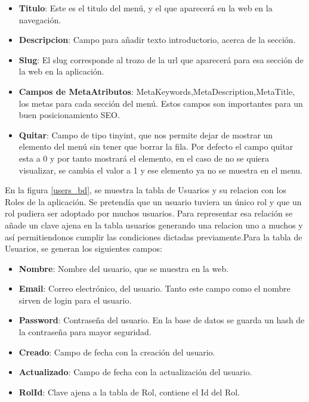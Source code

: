 \begin{itemize}

\item \textbf{Titulo}: Este es el titulo del menú, y el que aparecerá en la web en la navegación.
\item \textbf{Descripcion}: Campo para añadir texto introductorio, acerca de la sección.
\item \textbf{Slug}: El slug corresponde al trozo de la url que aparecerá para esa sección de la web en la aplicación.
\item \textbf{Campos de MetaAtributos}: MetaKeywords,MetaDescription,MetaTitle, los metas para cada sección del menú. Estos campos son importantes para un buen posicionamiento SEO.
\item \textbf{Quitar}: Campo de tipo tinyint, que nos permite dejar de mostrar un elemento del menú sin tener que borrar la fila. Por defecto el campo quitar esta a 0 y por tanto mostrará el elemento, en el caso de no se quiera visualizar, se cambia el valor a 1 y ese elemento ya no se muestra en el menu.

\end{itemize}

\vspace{5 mm}

En la figura \ref{users_bd}, se muestra la tabla de Usuarios y su relacion con los Roles de la aplicación. Se pretendía que un usuario tuviera un único rol y que un rol pudiera ser adoptado por muchos usuarios. Para representar esa relación se añade un clave ajena en la tabla usuarios generando una relacion uno a muchos y así permitiendonos cumplir las condiciones dictadas previamente.Para la tabla de Usuarios, se generan los siguientes campos:

\begin{itemize}

\item \textbf{Nombre}: Nombre del usuario, que se muestra en la web.
\item \textbf{Email}: Correo electrónico, del usuario. Tanto este campo como el nombre sirven de login para el usuario.
\item \textbf{Password}: Contraseña del usuario. En la base de datos se guarda un hash de la contraseña para mayor seguridad.
\item \textbf{Creado}: Campo de fecha con la creación del usuario.
\item \textbf{Actualizado}: Campo de fecha con la actualización del usuario.
\item \textbf{RolId}: Clave ajena a la tabla de Rol, contiene el Id del Rol.

\end{itemize}

